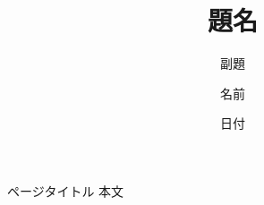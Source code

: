 \documentclass[dvipdfmx,10pt,notheorems]{beamer}
\title{題名}
\subtitle{副題}
\author{名前}
\institute{所属}
\date{日付}%
\theoremstyle{definition}
\begin{document}
\titlepage

\newpage
\begin{frame}{ページタイトル}
本文
\end{frame}
\end{document}
